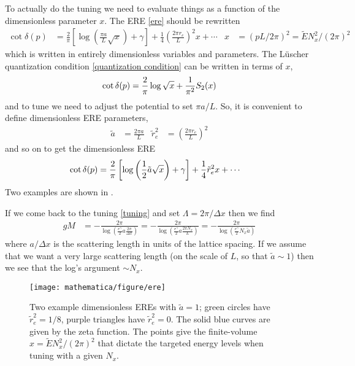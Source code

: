 To actually do the tuning we need to evaluate things as a function of the dimensionless parameter $x$.
The ERE \eqref{ere} should be rewritten
\begin{align}
    \cot \delta(p)
    &=
    \frac{2}{\pi}\left[ \log\left(\frac{\pi a}{L} \sqrt{x}\right)+ \gamma\right]
    +
    \frac{1}{4} \left(\frac{2\pi r_e }{L}\right)^2 x
    +
    \cdots
	&
	x&=(pL/2\pi)^2=\tilde{E}N_x^2 / (2\pi)^2
    \label{eq:ere dimensionless}
\end{align}
which is written in entirely dimensionless variables and parameters.
The L\"{u}scher quantization condition \eqref{quantization condition} can be written in terms of $x$,
\begin{align}
    \cot \delta(p) = \frac{2}{\pi} \log \sqrt{x} + \frac{1}{\pi^2} S_2(x)
	\label{eq:quantization condition dimensionless}
\end{align}
and to tune we need to adjust the potential to set $\pi a/L$.
So, it is convenient to define dimensionless ERE parameters,
\begin{align}
    \tilde{a} &= \frac{2 \pi a}{L}
    &
    \tilde{r}_e^2 &= \left(\frac{2 \pi r_e}{L}\right)^2
\end{align}
and so on to get the dimensionless ERE
\begin{align}
    \cot \delta(p)
    &=
	\frac{2}{\pi}\left[ \log\left(\frac{1}{2} \tilde{a} \sqrt{x}\right)+ \gamma\right]
    +
	\frac{1}{4} \tilde{r}_e^2 x
    +
    \cdots
    \label{eq:ere dimensionless}
\end{align}
Two examples are shown in .

If we come back to the tuning \eqref{tuning} and set $\Lambda=2\pi/\Delta x$ then we find
\begin{align}
	gM
	&= - \frac{2\pi}{\log\left(\frac{e^\gamma}{2} a \frac{2\pi}{\Delta x}\right)}
	= - \frac{2\pi}{\log\left(\frac{e^\gamma}{2} a \frac{2\pi N_x}{L}\right)}
	= - \frac{2\pi}{\log\left(\frac{e^\gamma}{2} N_x \tilde{a} \right)}
	\label{eq:coupling analytically}
\end{align}
where $a/\Delta x$ is the scattering length in units of the lattice spacing.
If we assume that we want a very large scattering length (on the scale of $L$, so that $\tilde{a} \sim 1$) then we see that the log's argument $\sim N_x$.

\begin{figure}
	\texttt{[image: mathematica/figure/ere]}
	\caption{
		Two example dimensionless EREs with $\tilde{a}=1$; green circles have $\tilde{r}_e^2=1/8$, purple triangles have $\tilde{r}_e^2=0$.
		The solid blue curves are given by the zeta function.
		The points give the finite-volume $x = \tilde{E} N_x^2 / (2\pi)^2$ that dictate the targeted energy levels when tuning with a given $N_x$.
	}
	\label{fig:ere tuning}
\end{figure}

